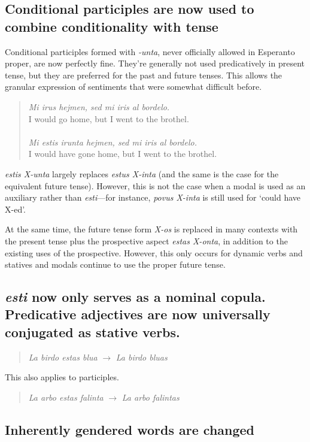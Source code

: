 \subsection{Conditional participles are now used to combine conditionality with tense}

Conditional participles formed with \textit{-unta}, never officially allowed in Esperanto proper, are now perfectly fine. They're generally not used predicatively in present tense, but they are preferred for the past and future tenses. This allows the granular expression of sentiments that were somewhat difficult before.
\begin{quote}
    \textit{Mi irus hejmen, sed mi iris al bordelo.}\\
    I would go home, but I went to the brothel.\\
    \\
    \textit{Mi estis irunta hejmen, sed mi iris al bordelo.}\\
    I would have gone home, but I went to the brothel.
\end{quote}

\textit{estis X-unta} largely replaces \textit{estus X-inta} (and the same is the case for the equivalent future tense). However, this is not the case when a modal is used as an auxiliary rather than \textit{esti}---for instance, \textit{povus X-inta} is still used for `could have X-ed'.

At the same time, the future tense form \textit{X-os} is replaced in many contexts with the present tense plus the prospective aspect \textit{estas X-onta}, in addition to the existing uses of the prospective. However, this only occurs for dynamic verbs and statives and modals continue to use the proper future tense.

\subsection{\textit{esti} now only serves as a nominal copula. Predicative adjectives are now universally conjugated as stative verbs.}

\begin{quote}
    \textit{La birdo estas blua} $\to$ \textit{La birdo bluas}
\end{quote}
This also applies to participles.
\begin{quote}
    \textit{La arbo estas falinta} $\to$ \textit{La arbo falintas}
\end{quote}

\subsection{Inherently gendered words are changed}

